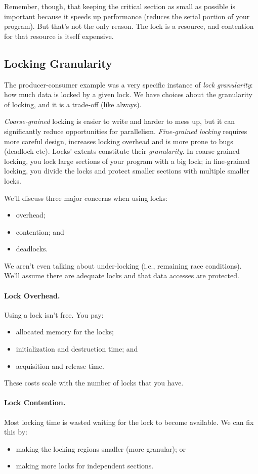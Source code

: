 \documentclass[a4paper]{report}
\begin{document}
Remember, though, that keeping the critical section as small as possible is important because it speeds up performance (reduces the serial portion of your program). But that's not the only reason. The lock is a resource, and contention for that resource is itself expensive.

\subsection*{Locking Granularity}

The producer-consumer example was a very specific instance of \textit{lock granularity}: how much data is locked by a given lock. We have choices about the granularity of locking, and it is a trade-off (like always).

\textit{Coarse-grained} locking is easier to write and harder to mess up, but it can significantly reduce opportunities for parallelism. \textit{
Fine-grained locking} requires more careful design,
increases locking overhead and is more prone to bugs (deadlock etc).
Locks' extents constitute their {\it granularity}. In coarse-grained locking, you
lock large sections of your program with a big lock; in fine-grained
locking, you divide the locks and protect smaller sections with multiple smaller locks.

We'll discuss three major concerns when using locks:
  \begin{itemize}
    \item overhead;
    \item contention; and
    \item deadlocks.
  \end{itemize}
We aren't even talking about under-locking (i.e., remaining race conditions). We'll assume there are adequate locks and that data accesses are protected.

\paragraph{Lock Overhead.}
  Using a lock isn't free. You pay:
  \begin{itemize}
    \item allocated memory for the locks;
    \item initialization and destruction time; and
    \item acquisition and release time.
  \end{itemize}
  These costs scale with the number of locks that you have.

\paragraph{Lock Contention.}
 Most locking time is wasted waiting for the lock to become available.
We can fix this by:
      \begin{itemize}
        \item making the locking regions smaller (more granular); or
        \item making more locks for independent sections.
      \end{itemize}
\end{document}
